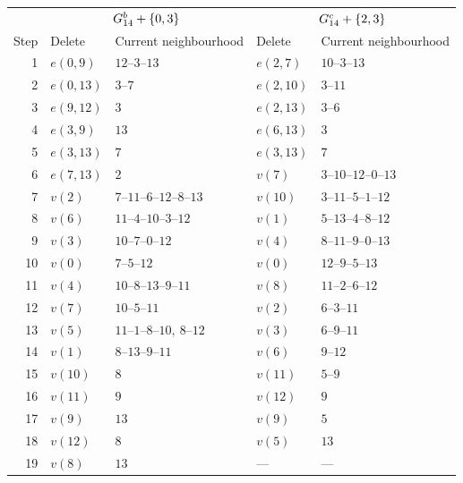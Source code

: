 \begin{tabular}{@{}rllll@{}}
\toprule
& \multicolumn{2}{c}{$G_{14}^{b}+\{0,3\}$} & \multicolumn{2}{c}{$G_{14}^{c}+\{2,3\}$} \\
Step & Delete & Current neighbourhood & Delete & Current neighbourhood \\
\midrule
1 & $e(0,9)$ & $12\text{--}3\text{--}13$ & $e(2,7)$ & $10\text{--}3\text{--}13$ \\
2 & $e(0,13)$ & $3\text{--}7$ & $e(2,10)$ & $3\text{--}11$ \\
3 & $e(9,12)$ & $3$ & $e(2,13)$ & $3\text{--}6$ \\
4 & $e(3,9)$ & $13$ & $e(6,13)$ & $3$ \\
5 & $e(3,13)$ & $7$ & $e(3,13)$ & $7$ \\
6 & $e(7,13)$ & $2$ & $v(7)$ & $3\text{--}10\text{--}12\text{--}0\text{--}13$ \\
7 & $v(2)$ & $7\text{--}11\text{--}6\text{--}12\text{--}8\text{--}13$ & $v(10)$ & $3\text{--}11\text{--}5\text{--}1\text{--}12$ \\
8 & $v(6)$ & $11\text{--}4\text{--}10\text{--}3\text{--}12$ & $v(1)$ & $5\text{--}13\text{--}4\text{--}8\text{--}12$ \\
9 & $v(3)$ & $10\text{--}7\text{--}0\text{--}12$ & $v(4)$ & $8\text{--}11\text{--}9\text{--}0\text{--}13$ \\
10 & $v(0)$ & $7\text{--}5\text{--}12$ & $v(0)$ & $12\text{--}9\text{--}5\text{--}13$ \\
11 & $v(4)$ & $10\text{--}8\text{--}13\text{--}9\text{--}11$ & $v(8)$ & $11\text{--}2\text{--}6\text{--}12$ \\
12 & $v(7)$ & $10\text{--}5\text{--}11$ & $v(2)$ & $6\text{--}3\text{--}11$ \\
13 & $v(5)$ & $11\text{--}1\text{--}8\text{--}10,\ 8\text{--}12$ & $v(3)$ & $6\text{--}9\text{--}11$ \\
14 & $v(1)$ & $8\text{--}13\text{--}9\text{--}11$ & $v(6)$ & $9\text{--}12$ \\
15 & $v(10)$ & $8$ & $v(11)$ & $5\text{--}9$ \\
16 & $v(11)$ & $9$ & $v(12)$ & $9$ \\
17 & $v(9)$ & $13$ & $v(9)$ & $5$ \\
18 & $v(12)$ & $8$ & $v(5)$ & $13$ \\
19 & $v(8)$ & $13$ & --- & --- \\
\bottomrule
\end{tabular}
